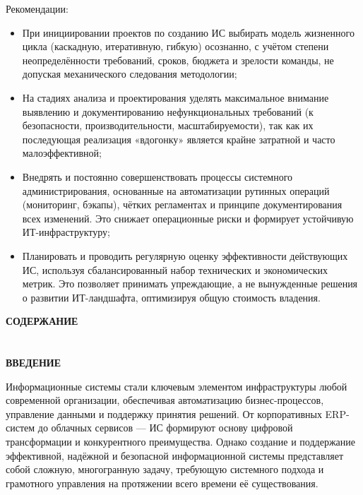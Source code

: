 \documentclass{SibFU-docs}
\begin{document}
Рекомендации:
\begin{itemize}[label=-]
    \item При инициировании проектов по созданию ИС выбирать модель жизненного цикла (каскадную, итеративную, гибкую) осознанно, с учётом степени неопределённости требований, сроков, бюджета и зрелости команды, не допуская механического следования методологии;
    \item На стадиях анализа и проектирования уделять максимальное внимание выявлению и документированию нефункциональных требований (к безопасности, производительности, масштабируемости), так как их последующая реализация «вдогонку» является крайне затратной и часто малоэффективной;
    \item Внедрять и постоянно совершенствовать процессы системного администрирования, основанные на автоматизации рутинных операций (мониторинг, бэкапы), чётких регламентах и принципе документирования всех изменений. Это снижает операционные риски и формирует устойчивую ИТ-инфраструктуру;
    \item Планировать и проводить регулярную оценку эффективности действующих ИС, используя сбалансированный набор технических и экономических метрик. Это позволяет принимать упреждающие, а не вынужденные решения о развитии ИТ-ландшафта, оптимизируя общую стоимость владения.
\end{itemize}

\newpage

\thispagestyle{empty}
\begin{center}
\bfseries СОДЕРЖАНИЕ
\end{center}
\vspace{-6pt}
\tableofcontents
\clearpage


\section*{}
\vspace*{-2.5em}
\begin{center}\textbf{ВВЕДЕНИЕ}\end{center}
{}

Информационные системы стали ключевым элементом инфраструктуры любой современной организации, обеспечивая автоматизацию бизнес-процессов, управление данными и поддержку принятия решений. От корпоративных ERP-систем до облачных сервисов — ИС формируют основу цифровой трансформации и конкурентного преимущества. Однако создание и поддержание эффективной, надёжной и безопасной информационной системы представляет собой сложную, многогранную задачу, требующую системного подхода и грамотного управления на протяжении всего времени её существования.
\end{document}
